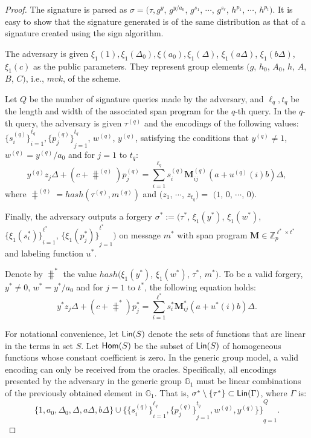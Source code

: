 \begin{proof}
  The signature is parsed as $\sigma=(\tau, g^y$, $g^{y/a_0}$, $g^{s_1}$, $\cdots$, $g^{s_\ell}$, $h^{p_1}$, $\cdots$, $h^{p_t})$. It is easy to show that the signature generated is of the same distribution as that of a signature created using the sign algorithm.

  The adversary is given $\xi_1(1), \xi_1(\Delta_0), \xi(a_0), \xi_1(\Delta)$, $\xi_1(a\Delta)$, $\xi_1(b\Delta)$, $\xi_1(c)$ as the public parameters. They represent group elements $(g$, $h_0$, $A_0$, $h$, $A$, $B$, $C)$, i.e., $mvk$, of the scheme.


  Let $Q$ be the number of signature queries made by the adversary, and $\ell_q, t_q$ be the length and width of the associated span program for the $q$-th query. In the $q$-th query, the adversary is given $\tau^{(q)}$ and the encodings of the following values: ${\{s_i^{(q)}\}}_{i=1}^{\ell_q}, {\{p_j^{(q)}\}}_{j=1}^{t_q}$, $w^{(q)}$, $y^{(q)}$, satisfying the conditions that $y^{(q)} \neq 1$, $w^{(q)} = y^{(q)}/a_0$ and for $j=1$ to $t_q$:
  $$
  y^{(q)} z_j \Delta + (c + \hash^{(q)}) p^{(q)}_j = \sum_{i=1}^{\ell_q} s^{(q)}_i \mathbf{M}^{(q)}_{ij}(a+u^{(q)}(i)b)\Delta,
  $$ where $\hash^{(q)}=hash(\tau^{(q)}, m^{(q)})$ and $(z_1$, $\cdots$, $z_{t_q}) =$ $(1$, $0$, $\cdots$, $0)$.


  Finally, the adversary outputs a forgery $\sigma^{\ast}:=(\tau^\ast$, $\xi_1(y^*)$, $\xi_1(w^\ast)$, ${\{\xi_1(s^{\ast}_i)\}}_{i=1}^{\ell^{\ast}}$, ${\{\xi_1(p^{\ast}_j)\}}_{j=1}^{t^\ast})$ on message $m^{\ast}$ with span program $\mathbf{M}\in\mathbb{Z}_p^{\ell^\ast \times t^\ast}$ and labeling function $u^\ast$.

  Denote by $\hash^\ast$ the value $hash(\xi_1(y^*)$, $\xi_1(w^\ast)$, $\tau^\ast$, $m^\ast)$. To be a valid forgery, $y^\ast \neq 0$, $w^\ast = y^\ast/a_0$ and for $j=1$ to $t^\ast$, the following equation holds:
  $$
  y^\ast z_j \Delta + (c + \hash^\ast)p^\ast_j = \sum_{i=1}^{\ell^\ast} s^\ast_i \mathbf{M}^\ast_{ij}(a+u^\ast(i)b)\Delta.
  $$

  For notational convenience, let $\textsf{Lin}(S)$ denote the sets of functions that are linear in the terms in set $S$. Let $\textsf{Hom}(S)$ be the subset of $\textsf{Lin}(S)$ of homogeneous functions whose constant coefficient is zero. In the generic group model, a valid encoding can only be received from the oracles. Specifically, all encodings presented by the adversary in the generic group $\mathbb{G}_1$ must be linear combinations of the previously obtained element in $\mathbb{G}_1$. That is, $\sigma^\ast \setminus \{\tau^\ast\}  \subset \textsf{Lin}(\Gamma)$, where $\Gamma$ is:
  $$
\{1, a_0, \Delta_0, \Delta, a\Delta, b\Delta\} \cup {\{{\{s_i^{(q)}\}}_{i=1}^{\ell_q}, {\{p_j^{(q)}\}}_{j=1}^{t_q}, w^{(q)}, y^{(q)}\}\}}_{q=1}^Q.
$$


\end{proof}
